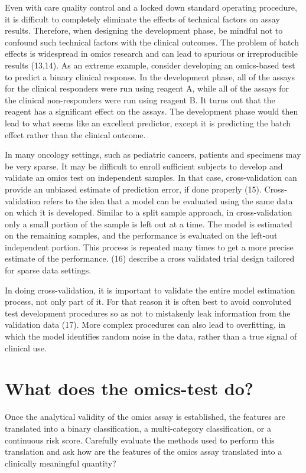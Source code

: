 \documentclass[11pt]{article}
\begin{document}
Even with care quality control and a locked down standard operating
procedure, it is difficult to completely eliminate the effects of
technical factors on assay results. Therefore, when designing the
development phase, be mindful not to confound such technical factors
with the clinical outcomes. The problem of batch effects is widespread
in omics research and can lead to spurious or irreproducible results
(13,14). As an extreme example, consider developing an omics-based test
to predict a binary clinical response. In the development phase, all of
the assays for the clinical responders were run using reagent A, while
all of the assays for the clinical non-responders were run using reagent
B. It turns out that the reagent has a significant effect on the assays.
The development phase would then lead to what seems like an excellent
predictor, except it is predicting the batch effect rather than the
clinical outcome.

In many oncology settings, such as pediatric cancers, patients and
specimens may be very sparse. It may be difficult to enroll sufficient
subjects to develop and validate an omics test on independent samples.
In that case, cross-validation can provide an unbiased estimate of
prediction error, if done properly (15). Cross-validation refers to the
idea that a model can be evaluated using the same data on which it is
developed. Similar to a split sample approach, in cross-validation only
a small portion of the sample is left out at a time. The model is
estimated on the remaining samples, and the performance is evaluated on
the left-out independent portion. This process is repeated many times to
get a more precise estimate of the performance. (16) describe a cross
validated trial design tailored for sparse data settings.

In doing cross-validation, it is important to validate the entire model
estimation process, not only part of it. For that reason it is often
best to avoid convoluted test development procedures so as not to
mistakenly leak information from the validation data (17). More complex
procedures can also lead to overfitting, in which the model identifies
random noise in the data, rather than a true signal of clinical use.

\section{What does the omics-test
do?}\label{what-does-the-omics-test-do}

Once the analytical validity of the omics assay is established, the
features are translated into a binary classification, a multi-category
classification, or a continuous risk score. Carefully evaluate the
methods used to perform this translation and ask how are the features of
the omics assay translated into a clinically meaningful quantity?
\end{document}
